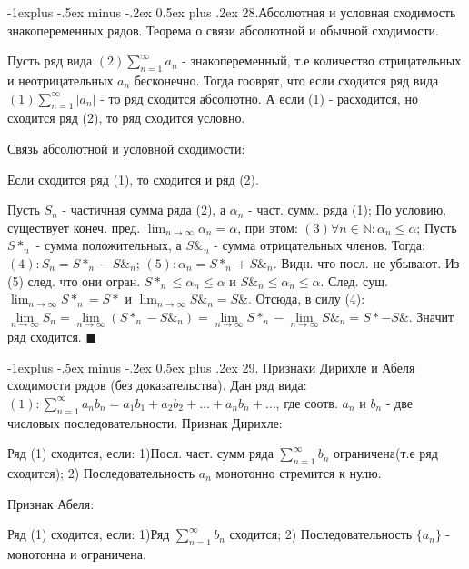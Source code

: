 \documentclass[unicode,10pt, landscape]{article}
\makeatletter
\renewcommand{\subsection}{\@startsection{subsection}{2}{0mm}%
                                {-1explus -.5ex minus -.2ex}%
                                {0.5ex plus .2ex}%
                                {\normalfont\normalsize\bfseries}}
\newenvironment{Proof} %
{\par\noindent{\bf Док-во:}} %
{\hfill$\scriptstyle\blacksquare$}
\makeatother
\begin{document}
\begin{multicols}{4}
\subsection{28.Абсолютная и условная сходимость знакопеременных рядов. Теорема о связи абсолютной и обычной сходимости.}
\begin{Def}
Пусть ряд вида $(2) \sum_{n=1}^\infty a_n$ - знакопеременный, т.е количество отрицательных и неотрицательных $a_n$ бесконечно. Тогда гооврят, что если сходится ряд вида $(1) \sum_{n=1}^\infty |a_n|$ - то ряд сходится абсолютно. А если (1) - расходится, но сходится ряд (2), то ряд сходится условно.
\end{Def}
Связь абсолютной и условной сходимости:
\begin{Th}
Если сходится ряд (1), то сходится и ряд (2).
\begin{Proof}
Пусть $S_n$ - частичная сумма ряда (2), а $\alpha_n$ - част. сумм. ряда (1); По условию, существует конеч. пред. $\lim_{n \to \infty} \alpha_n = \alpha$, при этом: $(3)\forall n \in \mathbb{N}: \alpha_n \leq \alpha$; Пусть $S*_n$ - сумма положительных, а $S\&_n$ - сумма отрицательных членов. Тогда: $(4): S_n = S*_n - S\&_n$; $(5): \alpha_n = S*_n + S\&_n$. Видн. что посл. не убывают. Из (5) след. что они огран. $S*_n \leq \alpha_n \leq \alpha$ и $S\&_n \leq \alpha_n \leq \alpha$. След. сущ. $\lim_{n \to \infty} S*_n = S*$ и $\lim_{n \to \infty} S\&_n = S\&$. Отсюда, в силу (4):$\lim\limits_{n\rightarrow\infty }S_{n}=\lim\limits_{n\rightarrow\infty }(S*_{n}-S\&_{n})=\lim\limits_{n\rightarrow\infty }S*_{n}-\lim\limits_{n\rightarrow\infty }S\&_{n}=S*-S\&$. Значит ряд сходится.
\end{Proof}
\end{Th}


\subsection{29. Признаки Дирихле и Абеля сходимости рядов (без доказательства).}
Дан ряд вида: $(1): \sum\limits_{n=1}^{\infty}a_{n}b_{n}=a_{1}b_{1}+a_{2}b_{2}+…+a_{n}b_{n}+…$, где соотв. $a_n$ и $b_n$ - две числовых последовательности.
Признак Дирихле:
\begin{Th}
Ряд (1) сходится, если: 1)Посл. част. сумм ряда $\sum_{n=1}^\infty b_n$ ограничена(т.е ряд сходится);
2) Последовательность $a_n$ монотонно стремится к нулю.
\end{Th}
Признак Абеля:
\begin{Th}
Ряд (1) сходится, если: 1)Ряд $\sum_{n=1}^\infty b_n$ сходится; 2) Последовательность $\{a_n\}$ - монотонна и ограничена.
\end{Th}


\end{multicols}
\end{document}
